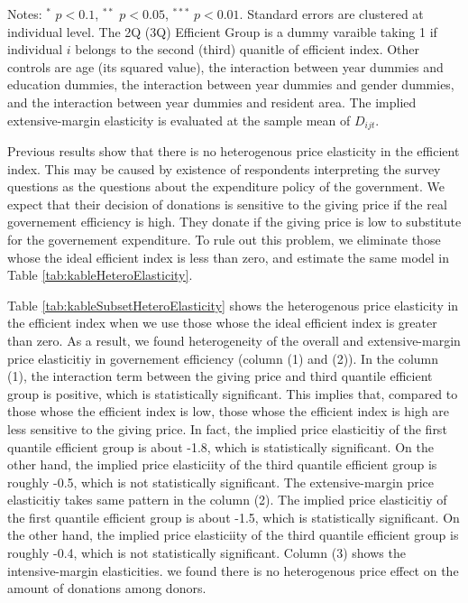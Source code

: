 \documentclass[
  11pt,
  a4paper,
]{article}
\begin{document}
\begin{table}
\begin{threeparttable}
  \begin{tablenotes}
  \item Notes: $^{*}$ $p < 0.1$, $^{**}$ $p < 0.05$, $^{***}$ $p < 0.01$. Standard errors are clustered at individual level. The 2Q (3Q) Efficient Group is a dummy varaible taking 1 if individual $i$ belongs to the second (third) quanitle of efficient index. Other controls are age (its squared value), the interaction between year dummies and education dummies, the interaction between year dummies and gender dummies, and the interaction between year dummies and resident area. The implied extensive-margin elasticity is evaluated at the sample mean of $D_{ijt}$.
  \end{tablenotes}
  \end{threeparttable}
  \end{table}

  Previous results show that there is no heterogenous price elasticity in the efficient index.
  This may be caused by existence of respondents
  interpreting the survey questions as the questions about the expenditure policy of the government.
  We expect that their decision of donations is sensitive to the giving price
  if the real governement efficiency is high.
  They donate if the giving price is low to substitute for the governement expenditure.
  To rule out this problem, we eliminate those whose the ideal efficient index is less than zero,
  and estimate the same model in Table \ref{tab:kableHeteroElasticity}.

  Table \ref{tab:kableSubsetHeteroElasticity} shows the heterogenous price elasticity in the efficient index
  when we use those whose the ideal efficient index is greater than zero.
  As a result, we found heterogeneity of the overall and extensive-margin price elasticitiy
  in governement efficiency (column (1) and (2)).
  In the column (1), the interaction term between the giving price and third quantile efficient group
  is positive, which is statistically significant.
  This implies that, compared to those whose the efficient index is low,
  those whose the efficient index is high are less sensitive to the giving price.
  In fact, the implied price elasticitiy of the first quantile efficient group is about -1.8,
  which is statistically significant.
  On the other hand, the implied price elasticiity of the third quantile efficient group is roughly -0.5,
  which is not statistically significant.
  The extensive-margin price elasticitiy takes same pattern in the column (2).
  The implied price elasticitiy of the first quantile efficient group is about -1.5,
  which is statistically significant.
  On the other hand, the implied price elasticiity of the third quantile efficient group is roughly -0.4,
  which is not statistically significant.
  Column (3) shows the intensive-margin elasticities.
  we found there is no heterogenous price effect on the amount of donations among donors.
\end{document}
